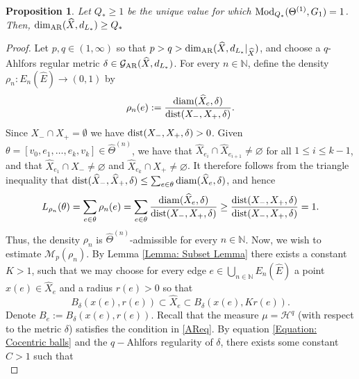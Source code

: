 \documentclass{amsart}
\newcommand{\diam}{{\rm diam}}
\newcommand{\Mod}{{\rm Mod}}
\newcommand{\dist}{{\rm dist}}
\newcommand{\AR}{{\rm AR}}
\newtheorem{proposition}[equation]{Proposition}
\numberwithin{equation}{section}
\theoremstyle{definition}
\theoremstyle{remark}
\newcommand{\N}{\mathbb{N}}
\newcommand{\cG}{\mathcal{G}}
\newcommand{\cH}{\mathcal{H}}
\newcommand{\cM}{\mathcal{M}}
\begin{document}
    \begin{proposition}\label{Proposition: Equality of Confdim}
        Let \(Q_*\geq 1\) be the unique value for which \(\Mod_{Q_*}(\Theta^{(1)},G_1)=1\). Then, \(\dim_\AR(\widehat{X},d_{L_*})\geq Q_*\)
    \end{proposition}
    \begin{proof}

        
        
        Let \(p,q\in (1,\infty)\) so that \(p>q>\dim_\AR(\widehat{X},d_{L_*}\vert_{\widehat{X}})\), and choose a $q$-Ahlfors regular metric \(\delta\in\cG_\AR(\widehat{X},d_{L_*})\). For every \(n\in\N\), define the density \(\rho_n\colon E_n(\widehat{E}) \to (0,1)\) by
            \[
                \rho_n(e):=\frac{\diam(\widehat{X}_e,\delta)}{\dist(X_-,X_+,\delta)}.
            \]
        Since $X_-\cap X_+=\emptyset$ we have $\dist(X_-,X_+,\delta)>0$. Given \(\theta=[v_0,e_1,\ldots,e_k,v_k]\in\widehat{\Theta}^{(n)}\), we have that \(\widehat{X}_{e_i}\cap \widehat{X}_{e_{i+1}}\neq\varnothing\) for all \(1\leq i\leq k-1\), and that \(\widehat{X}_{e_1}\cap X_-\neq \varnothing\) and \(\widehat{X}_{e_k}\cap X_+\neq \varnothing\). It therefore follows from the triangle inequality that \(\dist(\widehat{X}_-,\widehat{X}_+,\delta)\leq\sum_{e\in \theta}\diam(\widehat{X}_e,\delta)\), and hence
            \[
                L_{\rho_n}(\theta)=\sum_{e\in \theta}\rho_n(e)=\sum_{e\in \theta}\frac{\diam(\widehat{X}_e,\delta)}{\dist(X_-,X_+,\delta)}\geq\frac{\dist(X_-,X_+,\delta)}{\dist(X_-,X_+,\delta)}=1.
            \]
        Thus, the density \(\rho_n\) is \(\widehat{\Theta}^{(n)}\)-admissible for every \(n\in\N\). Now, we wish to estimate \(\cM_p(\rho_n)\). By Lemma \ref{Lemma: Subset Lemma} there exists a constant \(K>1\), such that we may choose for every edge \(e\in \bigcup_{n\in\N}E_n(\widehat{E})\) a point \(x(e)\in \widehat{X}_e\) and a radius \(r(e)>0\) so that 
            \begin{equation}\label{Equation: Cocentric balls}
                B_\delta(x(e),r(e))\subset \widehat{X}_e\subset B_\delta(x(e),Kr(e)).
            \end{equation}
        Denote \(B_e:=B_\delta(x(e),r(e))\). Recall that the measure $\mu=\cH^q$ (with respect to the metric $\delta$) satisfies the condition in \eqref{AReq}. By equation \eqref{Equation: Cocentric balls} and the $q-$Ahlfors regularity of \(\delta\), there exists some constant \(C>1\) such that
            \begin{equation}\label{Equation: Diameter Estimate}

\end{equation}
\end{proof}
\end{document}
